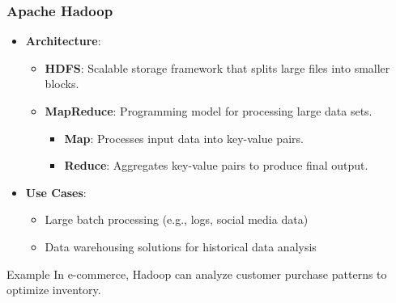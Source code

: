 \documentclass[aspectratio=169]{beamer}
\begin{document}
\begin{frame}[fragile]
    \frametitle{Apache Hadoop}
    \begin{itemize}
        \item \textbf{Architecture}:
        \begin{itemize}
            \item \textbf{HDFS}: Scalable storage framework that splits large files into smaller blocks.
            \item \textbf{MapReduce}: Programming model for processing large data sets.
            \begin{itemize}
                \item \textbf{Map}: Processes input data into key-value pairs.
                \item \textbf{Reduce}: Aggregates key-value pairs to produce final output.
            \end{itemize}
        \end{itemize}
        
        \item \textbf{Use Cases}:
        \begin{itemize}
            \item Large batch processing (e.g., logs, social media data)
            \item Data warehousing solutions for historical data analysis
        \end{itemize}
    \end{itemize}
    
    \begin{block}{Example}
        In e-commerce, Hadoop can analyze customer purchase patterns to optimize inventory.
    \end{block}
\end{frame}
\end{document}

